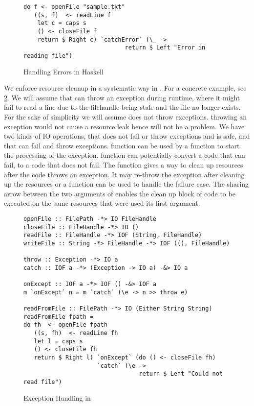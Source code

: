 \begin{figure}[h]
  \begin{framed}
\begin{verbatim}
do f <- openFile "sample.txt"
   ((s, f)  <- readLine f
    let c = caps s
    () <- closeFile f
    return $ Right c) `catchError` (\_ ->
                             return $ Left "Error in reading file")
\end{verbatim}
  \end{framed}
  \caption{Handling Errors in Haskell}
  \label{fig:haskell-error-handling}
\end{figure}

We enforce resource cleanup in a systematic way in \qub{}. For a concrete example, see \cref{fig:qub-file-exceptions}.
We will assume that  can throw an exception during runtime, where
it might fail to read a line due to the filehandle being stale and the file no longer exists.
For the sake of simplicity we will assume 
does not throw exceptions.  throwing an exception would not cause a resource leak hence will not be a problem.
We have two kinds of IO operations,  that does not fail or throw exceptions and is safe,
and  that can fail and throw exceptions.  function can be used by a function to start
the processing of the exception.  function can potentially convert a code that can fail, to a code
that does not fail. The  function gives a way to clean up resources after the code throws an exception. It may re-throw the
exception after cleaning up the resources or a  function can be used to handle the failure case.
The sharing arrow between the two arguments of  enables the clean up block of code to be executed on the same resources
that were used its first argument.

\begin{figure}[h]
  \begin{framed}
    \begin{verbatim}
openFile :: FilePath -*> IO FileHandle
closeFile :: FileHandle -*> IO ()
readFile :: FileHandle -*> IOF (String, FileHandle)
writeFile :: String -*> FileHandle -*> IOF ((), FileHandle)

throw :: Exception -*> IO a
catch :: IOF a -*> (Exception -> IO a) -&> IO a

onExcept :: IOF a -*> IOF () -&> IOF a
m `onExcept` n = m `catch` (\e -> n >> throw e)

readFromFile :: FilePath -*> IO (Either String String)
readFromFile fpath =
do fh  <- openFile fpath
   ((s, fh)  <- readLine fh
   let l = caps s
   () <- closeFile fh
   return $ Right l) `onExcept` (do () <- closeFile fh)
                     `catch` (\e ->
                                 return $ Left "Could not read file")
    \end{verbatim}
  \end{framed}
  \caption{Exception Handling in \qub{}}
  \label{fig:qub-file-exceptions}
\end{figure}


